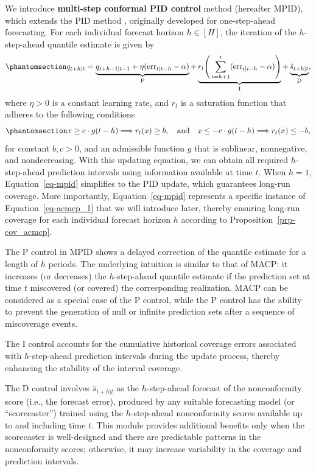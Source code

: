 \documentclass[
  11pt,
  a4paper,
]{article}
\theoremstyle{plain}
\theoremstyle{remark}
\begin{document}
We introduce \textbf{multi-step conformal PID control} method (hereafter
MPID), which extends the PID method \autocite{angelopoulos2024},
originally developed for one-step-ahead forecasting. For each individual
forecast horizon \(h\in[H]\), the iteration of the \(h\)-step-ahead
quantile estimate is given by
\begin{equation}\phantomsection\label{eq-mpid}{
q_{t+h|t}=\underbrace{q_{t+h-1|t-1}+\eta (\mathrm{err}_{t|t-h}-\alpha)}_{\mathrm{P}}+\underbrace{r_t\Bigg(\sum_{i=h+1}^t (\mathrm{err}_{i|i-h}-\alpha)\Bigg)}_{\mathrm{I}}+\underbrace{\hat{s}_{t+h|t}}_{\mathrm{D}},
}\end{equation} where \(\eta > 0\) is a constant learning rate, and
\(r_t\) is a saturation function that adheres to the following
conditions\pagebreak[1]\begin{equation}\phantomsection\label{eq-saturation_h}{
x \geq c \cdot g(t-h) \Longrightarrow r_t(x) \geq b, \quad \text {and} \quad x \leq-c \cdot g(t-h) \Longrightarrow r_t(x) \leq -b,
}\end{equation} for constant \(b, c > 0\), and an admissible function
\(g\) that is sublinear, nonnegative, and nondecreasing. With this
updating equation, we can obtain all required \(h\)-step-ahead
prediction intervals using information available at time \(t\). When
\(h=1\), Equation~\ref{eq-mpid} simplifies to the PID update, which
guarantees long-run coverage. More importantly, Equation~\ref{eq-mpid}
represents a specific instance of Equation~\ref{eq-acmcp_1} that we will
introduce later, thereby ensuring long-run coverage for each individual
forecast horizon \(h\) according to Proposition~\ref{prp-cov_acmcp}.

The P control in MPID shows a delayed correction of the quantile
estimate for a length of \(h\) periods. The underlying intuition is
similar to that of MACP: it increases (or decreases) the
\(h\)-step-ahead quantile estimate if the prediction set at time \(t\)
miscovered (or covered) the corresponding realization. MACP can be
considered as a special case of the P control, while the P control has
the ability to prevent the generation of null or infinite prediction
sets after a sequence of miscoverage events.

The I control accounts for the cumulative historical coverage errors
associated with \(h\)-step-ahead prediction intervals during the update
process, thereby enhancing the stability of the interval coverage.

The D control involves \(\hat{s}_{t+h|t}\) as the \(h\)-step-ahead
forecast of the nonconformity score (i.e., the forecast error), produced
by any suitable forecasting model (or ``scorecaster'') trained using the
\(h\)-step-ahead nonconformity scores available up to and including time
\(t\). This module provides additional benefits only when the
scorecaster is well-designed and there are predictable patterns in the
nonconformity scores; otherwise, it may increase variability in the
coverage and prediction intervals.
\end{document}
